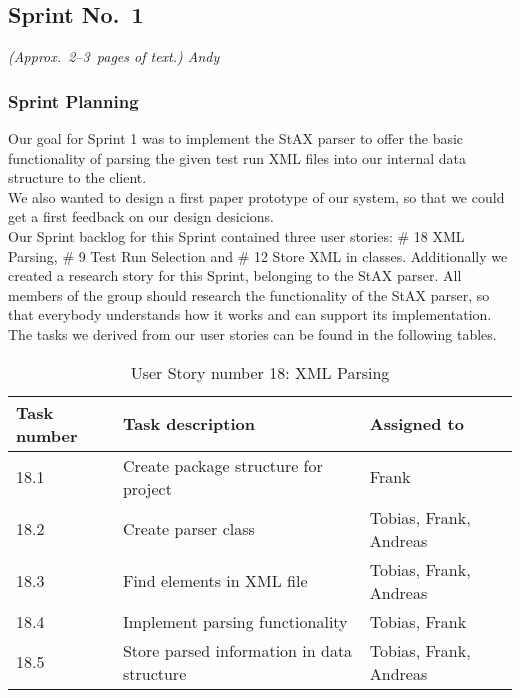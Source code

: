 
\subsection{Sprint No.~1}

\emph{(Approx.~2--3~pages of text.) Andy}

\subsubsection*{Sprint Planning}

Our goal for Sprint 1 was to implement the StAX parser to offer the basic functionality of parsing the given test run XML files into our internal data structure to the client. \\ 
We also wanted to design a first paper prototype of our system, so that we could get a first feedback on our design desicions. \\ 
Our Sprint backlog for this Sprint contained three user stories: \# 18 XML Parsing, \# 9 Test Run Selection and \# 12 Store XML in classes. Additionally we created a research story for this Sprint, belonging to the StAX parser. All members of the group should research the functionality of the StAX parser, so that everybody understands how it works and can support its implementation. \\ 
The tasks we derived from our user stories can be found in the following tables. \\ 

\begin{table}[h]
  \caption{User Story number 18: XML Parsing}
  \label{US_Parsing}
  \centering
  \begin{tabular}{p{1.5cm}|p{9cm}|p{3cm}|}
  	Task number & Task description & Assigned to \\ 
  	\hline
  	\hline
  	18.1 & Create package structure for project & Frank \\
  	\hline
  	18.2 & Create parser class & Tobias, Frank, Andreas \\ 
  	\hline
  	18.3 & Find elements in XML file & Tobias, Frank, Andreas \\ 
  	\hline
  	18.4 & Implement parsing functionality & Tobias, Frank \\ 
  	\hline
  	18.5 & Store parsed information in data structure & Tobias, Frank, Andreas \\ 
  	\hline
  \end{tabular}
\end{table} 

\ \\

